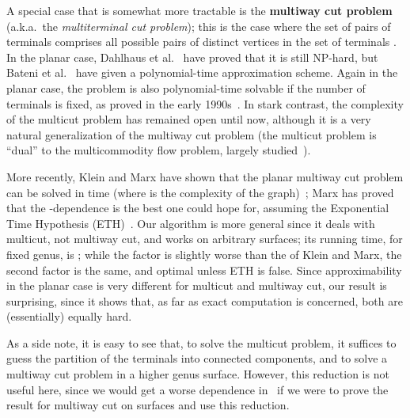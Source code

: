 \documentclass[11pt]{article}
\theoremstyle{plain}  \newtheorem{theorem}{Theorem}[section]
\theoremstyle{definition}
\begin{document}
\smallskip

A special case that is somewhat more tractable is the \textbf{multiway cut
  problem} (a.k.a.\ the \emph{multiterminal cut problem}); this is the case
where the set of pairs of terminals comprises all possible pairs of
distinct vertices in the set of terminals .  In the planar
case, Dahlhaus et al.~\cite{djpsy-cmc-94} have proved that it is still
NP-hard, but Bateni et al.~\cite{bhkm-ptasp-12} have given a
polynomial-time approximation scheme.  Again in the planar case, the
problem is also polynomial-time solvable if the number of terminals is
fixed, as proved in the early 1990s~\cite{djpsy-cmc-94,h-pmcp-98}.  In
stark contrast, the complexity of the multicut problem has remained open
until now, although it is a very natural generalization of the multiway cut
problem (the multicut problem is ``dual'' to the multicommodity flow
problem, largely studied~\cite[Chapters 70--76]{s-cope-03}).

More recently, Klein and Marx have shown that the planar multiway cut
problem can be solved in  time (where  is the
complexity of the graph)~\cite{km-spktc-12}; Marx has proved that the
-dependence is the best one could hope for, assuming the
Exponential Time Hypothesis (ETH)~\cite{m-tlbpm-12}.  Our algorithm is more
general since it deals with multicut, not multiway cut, and works on
arbitrary surfaces; its running time, for fixed genus, is
; while the  factor is slightly worse
than the  of Klein and Marx, the second factor is the same, and
optimal unless ETH is false.  Since approximability in the planar case is
very different for multicut and multiway cut, our result is surprising,
since it shows that, as far as exact computation is concerned, both are
(essentially) equally hard.

As a side note, it is easy to see that, to solve the multicut problem, it
suffices to guess the partition of the terminals into connected components,
and to solve a multiway cut problem in a higher genus surface.  However,
this reduction is not useful here, since we would get a worse dependence
in~ if we were to prove the result for multiway cut on surfaces and use
this reduction.

\smallskip
\end{document}
